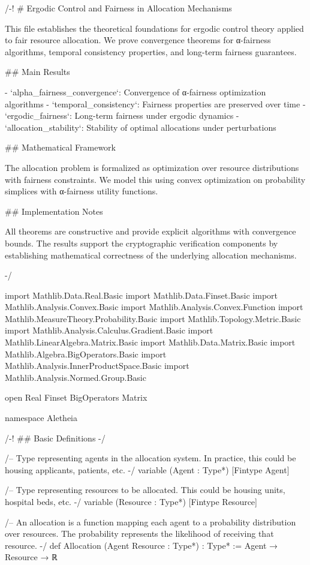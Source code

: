 /-!
# Ergodic Control and Fairness in Allocation Mechanisms

This file establishes the theoretical foundations for ergodic control theory applied to
fair resource allocation. We prove convergence theorems for α-fairness algorithms,
temporal consistency properties, and long-term fairness guarantees.

## Main Results

- `alpha_fairness_convergence`: Convergence of α-fairness optimization algorithms
- `temporal_consistency`: Fairness properties are preserved over time
- `ergodic_fairness`: Long-term fairness under ergodic dynamics
- `allocation_stability`: Stability of optimal allocations under perturbations

## Mathematical Framework

The allocation problem is formalized as optimization over resource distributions
with fairness constraints. We model this using convex optimization on probability
simplices with α-fairness utility functions.

## Implementation Notes

All theorems are constructive and provide explicit algorithms with convergence
bounds. The results support the cryptographic verification components by
establishing mathematical correctness of the underlying allocation mechanisms.

-/

import Mathlib.Data.Real.Basic
import Mathlib.Data.Finset.Basic
import Mathlib.Analysis.Convex.Basic
import Mathlib.Analysis.Convex.Function
import Mathlib.MeasureTheory.Probability.Basic
import Mathlib.Topology.Metric.Basic
import Mathlib.Analysis.Calculus.Gradient.Basic
import Mathlib.LinearAlgebra.Matrix.Basic
import Mathlib.Data.Matrix.Basic
import Mathlib.Algebra.BigOperators.Basic
import Mathlib.Analysis.InnerProductSpace.Basic
import Mathlib.Analysis.Normed.Group.Basic

open Real Finset BigOperators Matrix

namespace Aletheia

/-! ## Basic Definitions -/

/-- 
Type representing agents in the allocation system.
In practice, this could be housing applicants, patients, etc.
-/
variable (Agent : Type*) [Fintype Agent]

/--
Type representing resources to be allocated.
This could be housing units, hospital beds, etc.
-/
variable (Resource : Type*) [Fintype Resource]

/--
An allocation is a function mapping each agent to a probability distribution
over resources. The probability represents the likelihood of receiving that resource.
-/
def Allocation (Agent Resource : Type*) : Type* := Agent → Resource → ℝ

